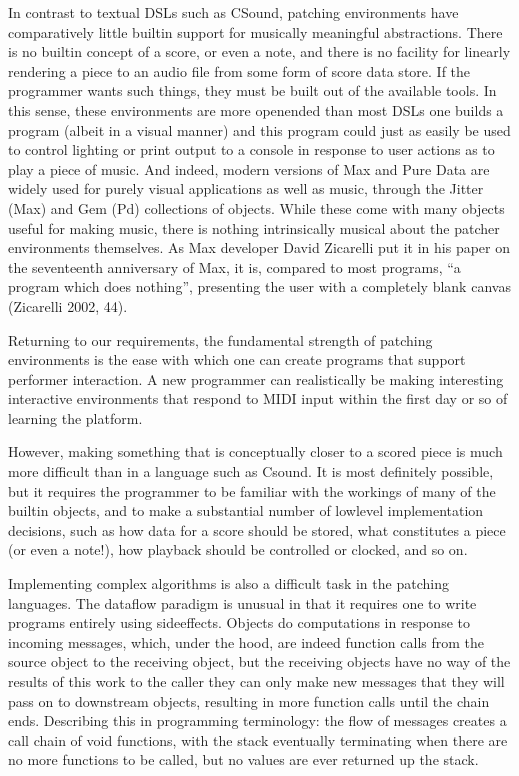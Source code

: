 \documentclass[letterpaper,10pt,english]{sphinxmanual}
\begin{document}
\sphinxAtStartPar
In contrast to textual DSLs such as CSound, patching environments have comparatively
little built\sphinxhyphen{}in support for musically meaningful abstractions.
There is no built\sphinxhyphen{}in concept of a score, or even a note, and there is no
facility for linearly rendering a piece to an audio file from some form of score data store.
If the programmer wants such things, they must be built out of the available tools.
In this sense, these environments are more open\sphinxhyphen{}ended than most DSLs \sphinxhyphen{} one
builds a program (albeit in a visual manner) and this program
could just as easily be used to control lighting or print output to a console
in response to user actions as to play a piece of music. And indeed, modern versions of Max
and Pure Data are widely used for purely visual applications as well as music,
through the Jitter (Max) and Gem (Pd) collections of objects.
While these come with many objects useful for making music, there is
nothing intrinsically musical about the patcher environments themselves.
As Max developer David Zicarelli put it in his paper on the seventeenth anniversary of Max,
it is, compared to most programs, “a program which does nothing”, presenting the user
with a completely blank canvas (Zicarelli 2002, 44).

\sphinxAtStartPar
Returning to our requirements, the fundamental strength of patching environments
is the ease with which one can create programs that support performer interaction.
A new programmer can realistically be making interesting interactive environments
that respond to MIDI input within the first day or so of learning the platform.

\sphinxAtStartPar
However, making something that is conceptually closer to a scored piece is much more
difficult than in a language such as Csound.
It is most definitely possible, but it requires the programmer to be
familiar with the workings of many of the built\sphinxhyphen{}in objects, and to make
a substantial number of low\sphinxhyphen{}level implementation decisions, such as
how data for a score should be stored, what constitutes a piece (or even a note!),
how playback should be controlled or clocked, and so on.

\sphinxAtStartPar
Implementing complex algorithms is also a difficult task in the patching languages.
The dataflow paradigm is unusual in that it requires one to write programs entirely
using side\sphinxhyphen{}effects. Objects do computations in response to incoming messages, which, under
the hood, are indeed function calls from the source object to the receiving object,
but the receiving objects have no way of  the results of this work to the caller \sphinxhyphen{} they
can only make new messages that they will pass on to downstream objects, resulting in more
function calls until the chain ends.
Describing this in programming terminology: the flow of messages creates a call chain
of void functions, with the stack eventually terminating when there are no more functions
to be called, but no values are ever returned up the stack.
\end{document}
